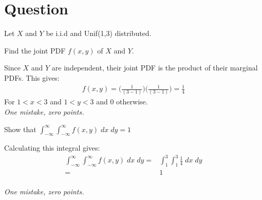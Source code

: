 \section{Question}

Let $X$ and $Y$ be i.i.d and Unif(1,3) distributed.
\begin{exercise}[0.5]
Find the joint PDF $f(x,y)$ of $X$ and $Y$.
\begin{solution}
    Since $X$ and $Y$ are independent, their joint PDF is the product of their marginal PDFs. This gives:
    \begin{align*}
        f(x,y) = \Big(\frac{1}{(3-1)}\Big) \Big(\frac{1}{(3-1)}\Big) = \frac{1}{4}
    \end{align*}
    For $1<x<3$ and $1<y<3$ and 0 otherwise. \\
    \textit{One mistake, zero points.}
\end{solution}
\end{exercise}

\begin{exercise}[0.5]
Show that $\int_{-\infty}^\infty \int_{-\infty}^\infty f(x,y) \; dx \; dy = 1$
\begin{solution}
    Calculating this integral gives:
    \begin{align*}
      \int_{-\infty}^\infty \int_{-\infty}^\infty f(x,y) \; dx \; dy =& \int_1^3 \int_1^3
      \frac{1}{4} \; dx \; dy \\
      =& 1
    \end{align*} \\
    \textit{One mistake, zero points.}
\end{solution}
\end{exercise}

